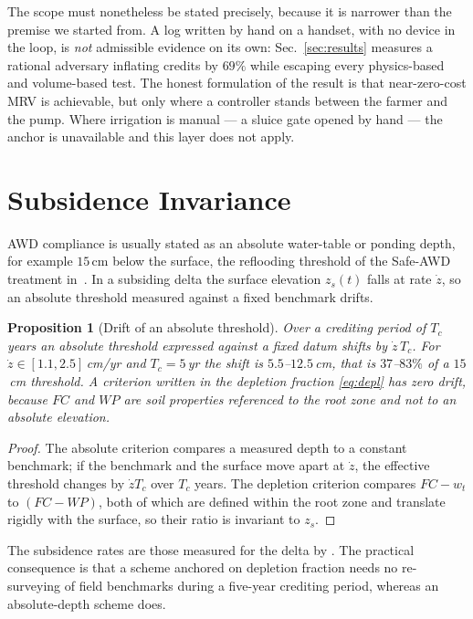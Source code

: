 \documentclass[journal]{IEEEtran}
\newtheorem{proposition}{Proposition}
\begin{document}
The scope must nonetheless be stated precisely, because it is narrower than the
premise we started from. A log written by hand on a handset, with no device in
the loop, is \emph{not} admissible evidence on its own: Sec.~\ref{sec:results}
measures a rational adversary inflating credits by $69\%$ while escaping every
physics-based and volume-based test. The honest formulation of the result is that
near-zero-cost MRV is achievable, but only where a controller stands between the
farmer and the pump. Where irrigation is manual --- a sluice gate opened by hand
--- the anchor is unavailable and this layer does not apply.

\section{Subsidence Invariance}
\label{sec:subsidence}

AWD compliance is usually stated as an absolute water-table or ponding depth,
for example $15$\,cm below the surface, the reflooding threshold of the Safe-AWD
treatment in~\cite{balaine2019}. In a subsiding delta
the surface elevation $z_s(t)$ falls at rate $\dot z$, so an absolute threshold
measured against a fixed benchmark drifts.

\begin{proposition}[Drift of an absolute threshold]
\label{prop:subsid}
Over a crediting period of $T_c$ years an absolute threshold expressed against
a fixed datum shifts by $\dot z\,T_c$. For $\dot z\in[1.1,2.5]$\,cm/yr and
$T_c=5$\,yr the shift is $5.5$--$12.5$\,cm, that is $37$--$83\%$ of a
$15$\,cm threshold. A criterion written in the depletion fraction
\eqref{eq:depl} has zero drift, because $FC$ and $WP$ are soil properties
referenced to the root zone and not to an absolute elevation.
\end{proposition}

\begin{proof}
The absolute criterion compares a measured depth to a constant benchmark; if
the benchmark and the surface move apart at $\dot z$, the effective threshold
changes by $\dot z T_c$ over $T_c$ years. The depletion criterion compares
$FC-w_t$ to $(FC-WP)$, both of which are defined within the root zone and
translate rigidly with the surface, so their ratio is invariant to $z_s$.
\end{proof}

The subsidence rates are those measured for the delta by
\cite{minderhoud2017}. The practical consequence is that a scheme anchored on
depletion fraction needs no re-surveying of field benchmarks during a five-year
crediting period, whereas an absolute-depth scheme does.
\end{document}
